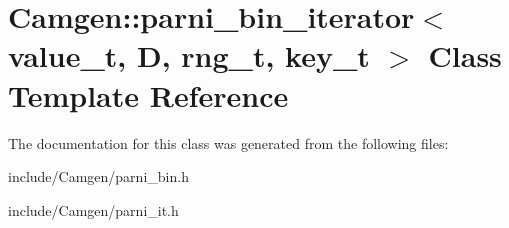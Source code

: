 \hypertarget{a00388}{\section{Camgen\-:\-:parni\-\_\-bin\-\_\-iterator$<$ value\-\_\-t, D, rng\-\_\-t, key\-\_\-t $>$ Class Template Reference}
\label{a00388}
}


The documentation for this class was generated from the following files\-:\begin{DoxyCompactItemize}
\item 
include/\-Camgen/parni\-\_\-bin.\-h\item 
include/\-Camgen/parni\-\_\-it.\-h\end{DoxyCompactItemize}
